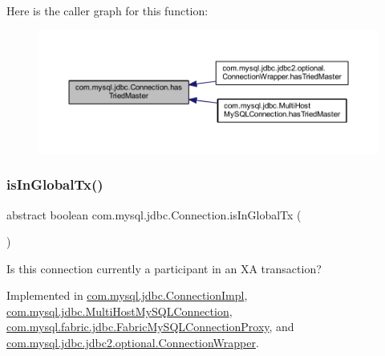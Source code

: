 Here is the caller graph for this function\+:\nopagebreak
\begin{figure}[H]
\begin{center}
\leavevmode
\includegraphics[width=350pt]{interfacecom_1_1mysql_1_1jdbc_1_1_connection_a2bc23d62512f6dfaac0566369a0125df_icgraph}
\end{center}
\end{figure}
\mbox{\label{interfacecom_1_1mysql_1_1jdbc_1_1_connection_a78a9a11946443467d3fbc7838922a205}} 
\subsubsection{\texorpdfstring{is\+In\+Global\+Tx()}{isInGlobalTx()}}
{\footnotesize\ttfamily abstract boolean com.\+mysql.\+jdbc.\+Connection.\+is\+In\+Global\+Tx (\begin{DoxyParamCaption}{ }\end{DoxyParamCaption})\hspace{0.3cm}{\ttfamily [abstract]}}

Is this connection currently a participant in an XA transaction? 

Implemented in \mbox{\hyperlink{classcom_1_1mysql_1_1jdbc_1_1_connection_impl_a5d92d55b2f7afca920591ae53c73a1cd}{com.\+mysql.\+jdbc.\+Connection\+Impl}}, \mbox{\hyperlink{classcom_1_1mysql_1_1jdbc_1_1_multi_host_my_s_q_l_connection_a7a8d4c611693701c71532835d4f1fffa}{com.\+mysql.\+jdbc.\+Multi\+Host\+My\+S\+Q\+L\+Connection}}, \mbox{\hyperlink{classcom_1_1mysql_1_1fabric_1_1jdbc_1_1_fabric_my_s_q_l_connection_proxy_a0c35dae41b910a397e4cd01f6e85f576}{com.\+mysql.\+fabric.\+jdbc.\+Fabric\+My\+S\+Q\+L\+Connection\+Proxy}}, and \mbox{\hyperlink{classcom_1_1mysql_1_1jdbc_1_1jdbc2_1_1optional_1_1_connection_wrapper_a62dab37c7e8a78cbb34735cf016b9591}{com.\+mysql.\+jdbc.\+jdbc2.\+optional.\+Connection\+Wrapper}}.

